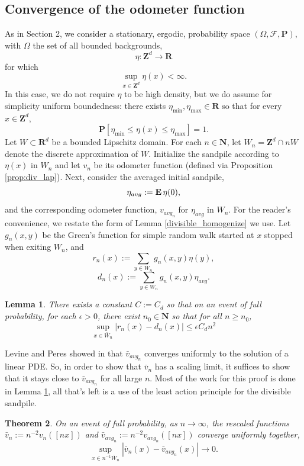 \documentclass[12pt]{amsart}
\newcommand{\R}{\mathbf{R}}
\newcommand{\Z}{\mathbf{Z}}
\newcommand{\N}{\mathbf{N}}
\newcommand{\E}{\mathop{\bf E{}}}
\newtheorem{theorem}{Theorem}[section]
\newtheorem{lemma}[theorem]{Lemma}
\begin{document}
\subsection{Convergence of the odometer function}


As in Section 2, we consider a stationary, ergodic, probability space $(\Omega, \mathcal{F}, \mathbf{P})$, with $\Omega$ the set of all bounded backgrounds, 
\[
\eta : \Z^d \to \R
\]
for which 
\[
\sup_{x \in \Z^d} \eta(x) < \infty. 
\]
In this case, we do not require $\eta$ to be high density, but we do assume for simplicity uniform boundedness: there exists $\eta_{\min}, \eta_{\max} \in \R$ so that for every $x \in \Z^d$, 
\begin{equation}
 \mathbf{P}\left[ \eta_{\min} \leq \eta(x) \leq \eta_{\max} \right] = 1. 
\end{equation} 
Let $W \subset \R^d$ be a bounded Lipschitz domain. For each $n \in \N$, let $W_n = \Z^d \cap n W$ denote the discrete approximation of $W$. 
Initialize the sandpile according to $\eta(x)$ in $W_n$ and let $v_{n}$ be its odometer function (defined via Proposition \ref{prop:div_lap}).  Next, consider the averaged initial sandpile, 
\[
\eta_{avg}  := \E \eta(0), 
\]
and the corresponding odometer function, $v_{avg_n}$ for $\eta_{avg}$ in $W_n$.   For the reader's convenience, we restate the form of 
Lemma \ref{divisible_homogenize} we use. Let $g_n(x,y)$ be the Green's function for simple random walk started at $x$ stopped when exiting $W_n$, and 
\[
r_n(x) := \sum_{y \in W_{n}} g_{n}(x,y) \eta(y),
\]
\[
d_n(x) :=  \sum_{y \in W_{n}} g_{n}(x,y) \eta_{avg}.
\]
\begin{lemma}\label{divisible_homogenize2}
There exists a constant $C := C_d$ so that on an event of full probability,  
for each $\epsilon > 0$, there exist $n_0 \in \N$ so that for all  $n \geq n_0$, 
\begin{equation}\label{eq2}
\sup_{x \in \bar{W}_{n}} \left| r_n(x) -d_n(x) \right| \leq \epsilon C_d n^2
\end{equation}
\end{lemma}


Levine and Peres showed in \cite{levine2010scaling} that $\bar{v}_{avg_n}$ converges uniformly to the solution of a linear PDE. 
So, in order to show that $\bar{v}_n$ has a scaling limit, it suffices to show that it stays close to $\bar{v}_{avg_n}$ for all large $n$. Most of the work for this proof is done in Lemma \ref{divisible_homogenize2}, all that's left is a use of the least action principle for the divisible sandpile.
\begin{theorem} \label{divisible_theorem}
On an event of full probability, as $n \to \infty$, the rescaled functions $\bar{v}_n:= n^{-2} v_n([n x])$  and $\bar{v}_{avg_n}:= n^{-2} v_{avg_n}([n x])$ converge uniformly together, 
\[
\sup_{x \in n^{-1} \bar{W}_n} |\bar{v}_n(x) - \bar{v}_{avg_n}(x)| \to 0.
\]
\end{theorem}
\end{document}
